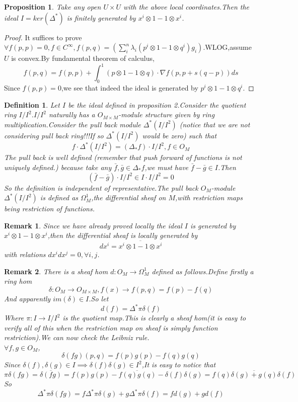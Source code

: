 \documentclass[a4paper,12pt]{article}
\theoremstyle{mystyle}
\theoremstyle{mystyle}
\newtheorem{proposition}{Proposition}
\newtheorem{definition}{\color{blue} Definition}
\newtheorem{remark}{\color{red} Remark}
\numberwithin{equation}{section}
\begin{document}
	\begin{proposition}
	Take any open $U\times U$ with the above local coordinates.Then the ideal $I=ker(\Delta^*)$ is finitely generated by $x^i\otimes 1-1\otimes x^i$.
	\end{proposition}
	\begin{proof}
		It suffices to prove $\forall f(p,p)=0,f\in C^\infty,f(p,q)=(\sum_i^n \lambda_i(p^i\otimes 1-1\otimes q^i)g_i)$.WLOG,assume $U$ is convex.By fundamental theorem of calculus,
		$$f(p,q)=f(p,p)+\int_0^1 (p\otimes 1-1\otimes q)\cdot \nabla f(p,p+s(q-p))ds$$
		Since $f(p,p)=0$,we see that indeed the ideal is generated by $p^i\otimes 1-1\otimes q^i$.
	\end{proof}
	\begin{definition}
		Let $I$ be the ideal defined in proposition 2.Consider the quotient ring $I/I^2$.$I/I^2$ naturally has a $O_{M\times M}$-module structure given by ring multiplication.Consider the pull back module $\Delta^*(I/I^2)$ (notice that we are not considering pull back ring!!!If so $\Delta^*(I/I^2)$ would be zero) such that
		$$f\cdot \Delta^*(I/I^2)=(\Delta_*f)\cdot I/I^2,f\in O_{M}$$
		The pull back is well defined (remember that push forward of functions is not uniquely defined.) because take any $\bar{f},\bar{g}\in \Delta_*f$,we must have $\bar{f}-\bar{g}\in I$.Then
		$$(\bar{f}-\bar{g})\cdot I/I^2\in I\cdot I/I^2=0$$
		So the definition is independent of representative.The pull back $O_M$-module $\Delta^*(I/I^2)$ is defined as $\Omega_M^1$,the differential sheaf on $M$,with restriction maps being restriction of functions.
	\end{definition}
	\begin{remark}
		Since we have already proved locally the ideal $I$ is generated by $x^i\otimes 1-1\otimes x^i$,then the differential sheaf is locally generated by
		$$dx^i=\overline{x^i\otimes 1-1\otimes x^i}$$
		with relations $dx^idx^j=0,\forall i,j$.
	\end{remark}
	\begin{remark}
		There is a sheaf hom $d:O_M\to \Omega_M^1$ defined as follows.Define firstly a ring hom
		$$\delta:O_M\to O_{M\times M},f(x)\to f(p,q)=f(p)-f(q)$$
		And apparently $im(\delta)\in I$.So let
		$$d(f)=\Delta^*\pi \delta(f)$$
		Where $\pi:I\to I/I^2$ is the quotient map.This is clearly a sheaf hom(it is easy to verify all of this when the restriction map on sheaf is simply function restriction).We can now check the Leibniz rule.
		\\
		$\forall f,g\in O_M$,
		$$\delta(fg)(p,q)=f(p)g(p)-f(q)g(q)$$
		Since $\delta(f),\delta(g)\in I\implies \delta(f)\delta(g)\in I^2$,It is easy to notice that
		$$\pi\delta(fg)=\overline{\delta(fg)}=\overline{f(p)g(p)-f(q)g(q)-\delta(f)\delta(g)}=\overline{f(q)\delta(g)+g(q)\delta(f)}$$
		So
		$$\Delta^*\pi \delta(fg)=f\Delta^*\pi \delta(g)+g\Delta^*\pi \delta(f)=fd(g)+gd(f)$$
	\end{remark}
\end{document}
